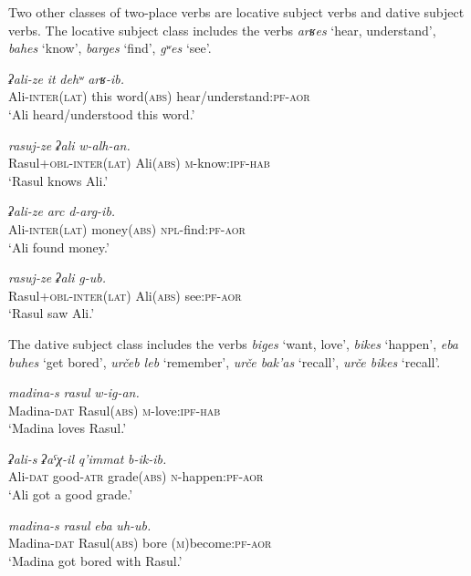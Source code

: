 ﻿\documentclass[output=paper]{langsci/langscibook}
\begin{document}
Two other classes of two-place verbs are locative subject verbs and
dative subject verbs. The locative subject class includes the verbs
\emph{arʁes} `hear, understand', \emph{bahes} `know', \emph{barges}
`find', \emph{gʷes} `see'.

\ea %
\gll \emph{ʡali-ze} \emph{it} \emph{dehʷ} \emph{arʁ-ib.}\\
Ali-\textsc{inter(lat)} {this} word(\textsc{abs}) hear/understand:\textsc{pf}-\textsc{aor}\\
\glt `Ali heard/understood this word.'

\ex\label{ex:7-21}
\gll \emph{rasuj-ze} \emph{ʡali} \emph{w-alh-an.}\\
Rasul+\textsc{obl}-\textsc{inter(lat)} Ali(\textsc{abs}) \textsc{m}-know:\textsc{ipf}-\textsc{hab}\\
\glt `Rasul knows Ali.'

\ex %
\gll \emph{ʡali-ze} \emph{arc} \emph{d-arg-ib.}\\
Ali-\textsc{inter(lat)} money(\textsc{abs}) \textsc{npl}-find:\textsc{pf}-\textsc{aor}\\
\glt `Ali found money.'

\ex %
\gll \emph{rasuj-ze} \emph{ʡali} \emph{g-ub.}\\
Rasul+\textsc{obl}-\textsc{inter(lat)} Ali(\textsc{abs}) see:\textsc{pf}-\textsc{aor}\\
\glt `Rasul saw Ali.'
\z

The dative subject class includes the verbs \emph{biges} `want, love',
\emph{bikes} `happen', \emph{eba buhes} `get bored', \emph{určeb leb}
`remember', \emph{urče bak'as} `recall', \emph{urče bikes} `recall'.

\ea %
\gll \emph{madina-s} \emph{rasul} \emph{w-ig-an.}\\
Madina-\textsc{dat} Rasul(\textsc{abs}) \textsc{m}-love:\textsc{ipf}-\textsc{hab}\\
\glt `Madina loves Rasul.'

\ex %
\gll \emph{ʡali-s} \emph{ʡaˤχ-il} \emph{q'immat} \emph{b-ik-ib.}\\
Ali-\textsc{dat} good-\textsc{atr} grade(\textsc{abs}) \textsc{n}-happen:\textsc{pf}-\textsc{aor}\\
\glt `Ali got a good grade.'

\ex %
\gll \emph{madina-s} \emph{rasul} \emph{eba} \emph{uh-ub.}\\
Madina-\textsc{dat} Rasul(\textsc{abs}) bore (\textsc{m})become:\textsc{pf}-\textsc{aor}\\
\glt `Madina got bored with Rasul.'
\end{document}

